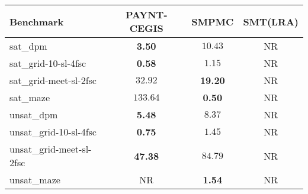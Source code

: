 \begin{tabular}{lccc}
\toprule
Benchmark & PAYNT-CEGIS & SMPMC & SMT(LRA) \\
\midrule
sat\_dpm & \textbf{3.50} & $10.43$ & NR \\
sat\_grid-10-sl-4fsc & \textbf{0.58} & $1.15$ & NR \\
sat\_grid-meet-sl-2fsc & $32.92$ & \textbf{19.20} & NR \\
sat\_maze & $133.64$ & \textbf{0.50} & NR \\
unsat\_dpm & \textbf{5.48} & $8.37$ & NR \\
unsat\_grid-10-sl-4fsc & \textbf{0.75} & $1.45$ & NR \\
unsat\_grid-meet-sl-2fsc & \textbf{47.38} & $84.79$ & NR \\
unsat\_maze & NR & \textbf{1.54} & NR \\
\bottomrule
\end{tabular}

